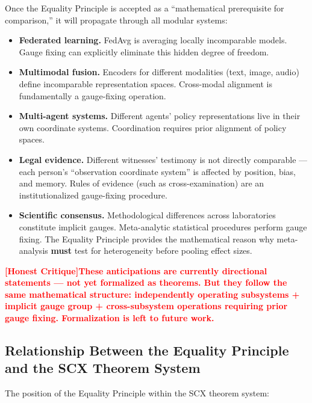 \documentclass[12pt,a4paper]{article}
\theoremstyle{remark}
\newcommand{\honestcrit}[1]{%
    \textcolor{red}{\textbf{[Honest Critique]#1}}%
}
\begin{document}
Once the Equality Principle is accepted as a ``mathematical prerequisite for comparison,'' it will propagate through all modular systems:

\begin{itemize}
    \item \textbf{Federated learning.} FedAvg is averaging locally incomparable models. Gauge fixing can explicitly eliminate this hidden degree of freedom.
    \item \textbf{Multimodal fusion.} Encoders for different modalities (text, image, audio) define incomparable representation spaces. Cross-modal alignment is fundamentally a gauge-fixing operation.
    \item \textbf{Multi-agent systems.} Different agents' policy representations live in their own coordinate systems. Coordination requires prior alignment of policy spaces.
    \item \textbf{Legal evidence.} Different witnesses' testimony is not directly comparable --- each person's ``observation coordinate system'' is affected by position, bias, and memory. Rules of evidence (such as cross-examination) are an institutionalized gauge-fixing procedure.
    \item \textbf{Scientific consensus.} Methodological differences across laboratories constitute implicit gauges. Meta-analytic statistical procedures perform gauge fixing. The Equality Principle provides the mathematical reason why meta-analysis \textbf{must} test for heterogeneity before pooling effect sizes.
\end{itemize}

\honestcrit{These anticipations are currently directional statements --- not yet formalized as theorems. But they follow the same mathematical structure: independently operating subsystems + implicit gauge group + cross-subsystem operations requiring prior gauge fixing. Formalization is left to future work.}

\subsection{Relationship Between the Equality Principle and the SCX Theorem System}

The position of the Equality Principle within the SCX theorem system:
\end{document}
